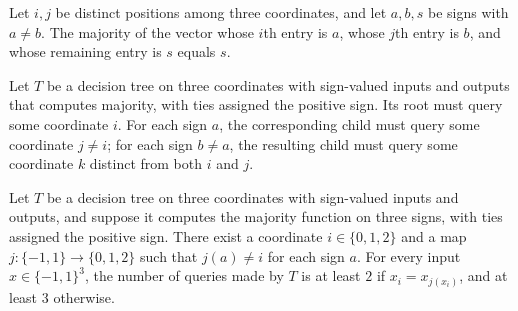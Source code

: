 \begin{theorem}
\label{FABL.majority_majorityThreeFixedTwoInput}
\leanok
{}
Let $i,j$ be distinct positions among three coordinates, and let $a,b,s$ be signs with
$a\ne b$. The majority of the vector whose $i$th entry is $a$, whose $j$th entry is $b$,
and whose remaining entry is $s$ equals $s$.
\end{theorem}

\begin{theorem}
\label{FABL.FiniteDecisionTree.exists_majorityThree_querySkeleton}
\leanok
{}
Let $T$ be a decision tree on three coordinates with sign-valued inputs and outputs that
computes majority, with ties assigned the positive sign. Its root must query some
coordinate $i$. For each sign $a$, the corresponding child must query some coordinate
$j\ne i$; for each sign $b\ne a$, the resulting child must query some coordinate $k$
distinct from both $i$ and $j$.
\end{theorem}

\begin{theorem}
\label{FABL.FiniteDecisionTree.exists_majorityThree_first_second}
\leanok
{}
Let $T$ be a decision tree on three coordinates with sign-valued inputs and outputs, and
suppose it computes the majority function on three signs, with ties assigned the
positive sign. There exist a coordinate $i\in\{0,1,2\}$ and a map
$j:\{−1,1\}\to\{0,1,2\}$ such that $j(a)\ne i$ for each sign $a$. For every input
$x\in\{−1,1\}^3$, the number of queries made by $T$ is at least $2$ if $x_i=x_{j(x_i)}$,
and at least $3$ otherwise.
\end{theorem}

